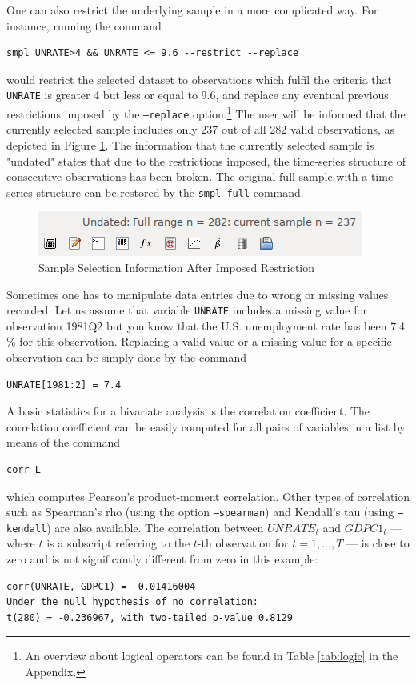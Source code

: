 \documentclass[11pt]{article}
\begin{document}
One can also restrict the underlying sample in a more complicated way. For instance, running the command 
\begin{Verbatim}[baselinestretch=0.75, fontsize=\small]
smpl UNRATE>4 && UNRATE <= 9.6 --restrict --replace
\end{Verbatim}
would restrict the selected dataset to observations which fulfil the criteria that \texttt{UNRATE} is greater 4 but less or equal to 9.6, and replace any eventual previous restrictions imposed by the \texttt{---replace} option.\footnote{An overview about logical operators can be found in Table \ref{tab:logic} in the Appendix.} The user will be informed that the currently selected sample includes only 237 out of all 282 valid observations, as depicted in Figure \ref{fig:smpl}. The information that the currently selected sample is "undated" states that due to the restrictions imposed, the time-series structure of consecutive observations has been broken. The original full sample with a time-series structure can be restored by the \texttt{smpl full} command.

\begin{figure}[!h]
	\centering
	\includegraphics[width=.42\textwidth]{../figures/smpl_restrict}
	\caption{Sample Selection Information After Imposed Restriction}
	\label{fig:smpl}
\end{figure}

Sometimes one has to manipulate data entries due to wrong or missing values recorded. Let us assume that variable \texttt{UNRATE} includes a missing value for observation 1981Q2 but you know that the U.S. unemployment rate has been 7.4 \% for this observation. Replacing a valid value or a missing value for a specific observation can be simply done by the command
\begin{Verbatim}[baselinestretch=0.75, fontsize=\small]
UNRATE[1981:2] = 7.4
\end{Verbatim}

A basic statistics for a bivariate analysis is the correlation coefficient. The correlation coefficient can be easily computed for all pairs of variables in a list by means of the command
\begin{Verbatim}[baselinestretch=0.75, fontsize=\small]
corr L
\end{Verbatim}
which computes Pearson's product-moment correlation. Other types of correlation such as Spearman's rho (using the option \texttt{---spearman}) and Kendall's tau (using \texttt{---kendall}) are also available. The correlation between $UNRATE_t$ and $GDPC1_t$ --- where $ t $ is a subscript referring to the $ t $-th observation for $ t=1,\ldots, T $ --- is close to zero and is not significantly different from zero in this example:
\begin{Verbatim}[baselinestretch=0.75, fontsize=\small]
corr(UNRATE, GDPC1) = -0.01416004
Under the null hypothesis of no correlation:
t(280) = -0.236967, with two-tailed p-value 0.8129
\end{Verbatim}
\end{document}

